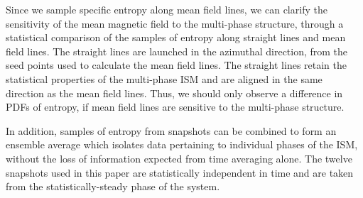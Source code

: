 \documentclass[useAMS,usenatbib]{mn2e}
\begin{document}
Since we sample specific entropy along mean field lines, we can clarify the sensitivity of the mean magnetic field to the multi-phase structure, through a statistical comparison of the samples of entropy along straight lines and mean field lines. The straight lines are launched in the azimuthal direction, from the seed points used to calculate the mean field lines. The straight lines retain the statistical properties of the multi-phase ISM and are aligned in the same direction as the mean field lines. Thus, we should only observe a difference in PDFs of entropy, if mean field lines are sensitive to the multi-phase structure. 

In addition, samples of entropy from snapshots can be combined to form an ensemble average which isolates data pertaining to individual phases of the ISM, without the loss of information expected from time averaging alone. The twelve snapshots used in this paper are statistically independent in time and are taken from the statistically-steady phase of the system.
\end{document}
